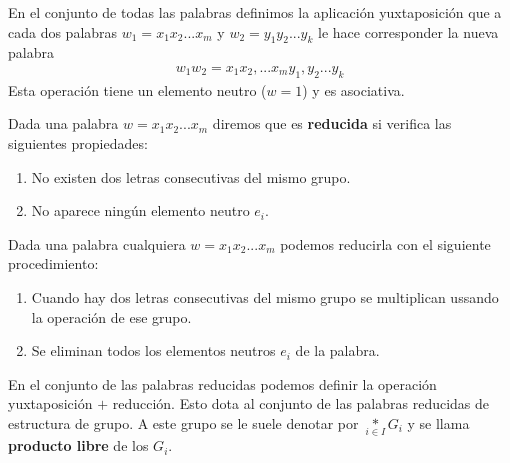 \begin{definicion}
    En el conjunto de todas las palabras definimos la aplicación yuxtaposición que a cada dos palabras $w_1=x_1x_2...x_m$ y $w_2=y_1y_2...y_k$ le hace corresponder la nueva palabra
    \begin{gather*}
        w_1w_2 = x_1x_2,...x_my_1,y_2...y_k
    \end{gather*}
    Esta operación tiene un elemento neutro ($w=1$) y es asociativa.
\end{definicion}

\begin{definicion}
    Dada una palabra $w=x_1x_2...x_m$ diremos que es \textbf{reducida} si verifica las siguientes propiedades:
    \begin{enumerate}
        \item No existen dos letras consecutivas del mismo grupo.
        \item No aparece ningún elemento neutro $e_i$.
    \end{enumerate}
\end{definicion}

\begin{observacion}
    Dada una palabra cualquiera $w=x_1x_2...x_m$ podemos reducirla con el siguiente procedimiento:
    \begin{enumerate}
        \item Cuando hay dos letras consecutivas del mismo grupo se multiplican ussando la operación de ese grupo.
        \item Se eliminan todos los elementos neutros $e_i$ de la palabra.
    \end{enumerate}
\end{observacion}

\begin{definicion}
    En el conjunto de las palabras reducidas podemos definir la operación yuxtaposición $+$ reducción. Esto dota al conjunto de las palabras reducidas de estructura de grupo. A este grupo se le suele denotar por $\underset{i\in I}{\ast}G_i$ y se llama \textbf{producto libre} de los $G_i$.
\end{definicion}

